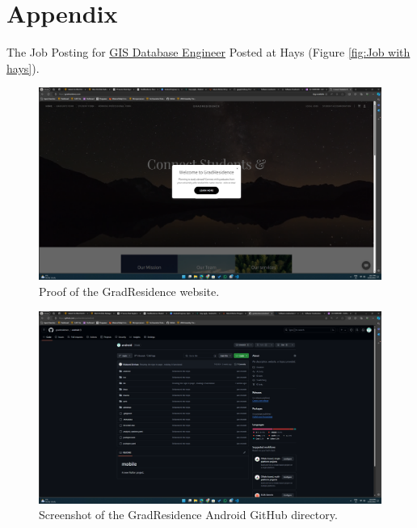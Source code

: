 \documentclass{article}
\begin{document}
\section*{Appendix}
The Job Posting for \href{https://www.hays.com.au/job-detail/gis-database-engineer-nsw---sydney-cbd_2891906?q=Gis%20Data%20Engineer&location=&applyId=JOB_5120563&jobSource=HaysGCJ&isSponsored=N&specialismId=&subSpecialismId=&jobName=projects%2Fmineral-balm-174308%2Ftenants%2Fab5d683d-f9a5-4b85-bfe0-eb74881e24cf%2Fjobs%2F128663770535731910&lang=en}{GIS Database Engineer} Posted at Hays (Figure \ref{fig:Job with hays}).

\begin{figure}[ht!]
    \centering
    \includegraphics[width=\textwidth, height=0.4\textheight, keepaspectratio]{../gradResidence.png}
    \caption{Proof of the GradResidence website.}
    \label{fig:gradResidence}
\end{figure}

\vspace{1cm}

\begin{figure}[ht!]
    \centering
    \includegraphics[width=\textwidth, height=0.4\textheight, keepaspectratio]{../gradResidence_Android.png}
    \caption{Screenshot of the GradResidence Android GitHub directory.}
    \label{fig:gradResidenceAndroid}
\end{figure}
\end{document}

